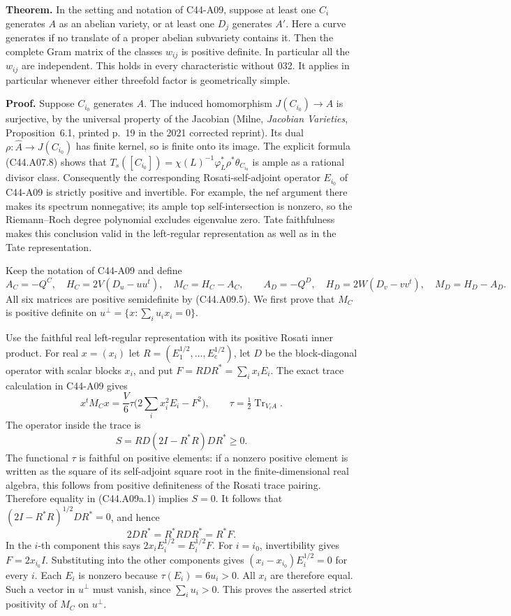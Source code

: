 \documentclass[11pt]{article}
\theoremstyle{remark}\newtheorem{remark}[theorem]{Remark}
\begin{document}
\textbf{Theorem.}
In the setting and notation of C44-A09, suppose at least one
$C_i$ generates $A$ as an abelian variety, or at least one
$D_j$ generates $A'$. Here a curve generates if no translate of
a proper abelian subvariety contains it. Then the complete
Gram matrix of the classes $w_{ij}$ is positive definite.
In particular all the $w_{ij}$ are independent. This holds in
every characteristic without 032. It applies in particular
whenever either threefold factor is geometrically simple.

\textbf{Proof.}
Suppose $C_{i_0}$ generates $A$. The induced homomorphism
$J(C_{i_0})\to A$ is surjective, by the universal property of
the Jacobian (Milne, \emph{Jacobian Varieties}, Proposition~6.1,
printed p.~19 in the 2021 corrected reprint). Its dual
$\rho:\widehat A\to J(C_{i_0})$ has finite kernel, so is finite
onto its image. The explicit formula (C44.A07.8) shows that
$T_s([C_{i_0}])=\chi(L)^{-1}\varphi_L^*\rho^*\theta_{C_{i_0}}$
is ample as a rational divisor class. Consequently the
corresponding Rosati-self-adjoint operator $E_{i_0}$ of C44-A09
is strictly positive and invertible. For example, the nef
argument there makes its spectrum nonnegative; its ample top
self-intersection is nonzero, so the Riemann--Roch degree
polynomial excludes eigenvalue zero. Tate faithfulness makes
this conclusion valid in the left-regular representation as
well as in the Tate representation.

Keep the notation of C44-A09 and define
\[
 A_C=-Q^C,\quad H_C=2V(D_u-uu^t),\quad M_C=H_C-A_C,
 \qquad
 A_D=-Q^D,\quad H_D=2W(D_v-vv^t),\quad M_D=H_D-A_D.
\]
All six matrices are positive semidefinite by (C44.A09.5).
We first prove that $M_C$ is positive definite on
$u^\perp=\{x:\sum_i u_ix_i=0\}$.

Use the faithful real left-regular representation with its
positive Rosati inner product. For real $x=(x_i)$ let
$R=(E_1^{1/2},\ldots,E_e^{1/2})$, let $D$ be the block-diagonal
operator with scalar blocks $x_i$, and put
$F=RDR^*=\sum_i x_iE_i$. The exact trace calculation in
C44-A09 gives
\[
 x^tM_Cx=\frac V6\tau\bigl(2\sum_i x_i^2E_i-F^2\bigr),
 \qquad \tau=\tfrac12\operatorname{Tr}_{V_\ell A}.
 \tag{C44.A09a.1}
\]
The operator inside the trace is
\[
 S=RD(2I-R^*R)DR^*\ge0.
\]
The functional $\tau$ is faithful on positive elements: if a
nonzero positive element is written as the square of its
self-adjoint square root in the finite-dimensional real
algebra, this follows from positive definiteness of the
Rosati trace pairing. Therefore equality in (C44.A09a.1)
implies $S=0$. It follows that
$(2I-R^*R)^{1/2}DR^*=0$, and hence
\[
                    2DR^*=R^*RDR^*=R^*F.
 \tag{C44.A09a.2}
\]
In the $i$-th component this says
$2x_iE_i^{1/2}=E_i^{1/2}F$.
For $i=i_0$, invertibility gives $F=2x_{i_0}I$.
Substituting into the other components gives
$(x_i-x_{i_0})E_i^{1/2}=0$ for every $i$.
Each $E_i$ is nonzero because $\tau(E_i)=6u_i>0$.
All $x_i$ are therefore equal. Such a vector in $u^\perp$
must vanish, since $\sum_i u_i>0$. This proves the asserted
strict positivity of $M_C$ on $u^\perp$.
\end{document}

